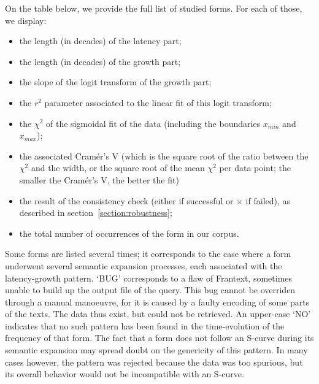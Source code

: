 \documentclass[12pt,twocolumn,amsmath,amssymb,aps,longbibliography]{revtex4-1}  %
\begin{document}
{{On the table below, we provide the full list of studied forms. For each of those, we display:
\begin{itemize} 
\item the length (in decades) of the latency part;
\item the length (in decades) of the growth part;
\item the slope of the logit transform of the growth part;
\item the $r^2$ parameter associated to the linear fit of this logit transform;
\item the $\chi^2$ of the sigmoidal fit of the data (including the boundaries $x_{min}$ and $x_{max}$);
\item the associated Cram\'er's V (which is the square root of the ratio between the $\chi^2$ and the width, or the square root of the mean $\chi^2$ per data point; the smaller the Cram\'er's V, the better the fit)
\item the result of the consistency check (either \checkmark if successful or $\times$ if failed), as described in section~\ref{section:robustness};
\item the total number of occurrences of the form in our corpus. 
\end{itemize}

 Some forms are listed several times; it corresponds to the case where a form underwent several semantic expansion processes, each associated with the latency-growth pattern. `BUG' corresponds to a flaw of Frantext, sometimes unable to build up the output file of the query. This bug cannot be overriden through a manual manoeuvre, for it is caused by a faulty encoding of some parts of the texts. The data thus exist, but could not be retrieved. An upper-case `NO' indicates that no such pattern has been found in the time-evolution of the frequency of that form. The fact that a form does not follow an S-curve during its semantic expansion may spread doubt on the genericity of this pattern. In many cases however, the pattern was rejected because the data was too spurious, but its overall behavior would not be incompatible with an S-curve. 

}}
\end{document}
